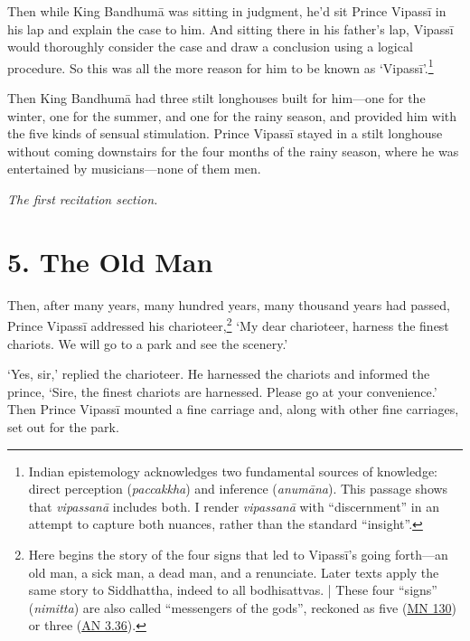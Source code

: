 \documentclass[12pt,openany]{book}%
\newcommand*{\scendsection}[1]{\begin{Center}\begin{small}\textit{#1}\end{small}\end{Center}\addvspace{1em}}
\begin{document}
Then while King \textsanskrit{Bandhumā} was sitting in judgment, he’d sit Prince \textsanskrit{Vipassī} in his lap and explain the case to him. And sitting there in his father’s lap, \textsanskrit{Vipassī} would thoroughly consider the case and draw a conclusion using a logical procedure. So this was all the more reason for him to be known as ‘\textsanskrit{Vipassī}’.\footnote{Indian epistemology acknowledges two fundamental sources of knowledge: direct perception (\textit{paccakkha}) and inference (\textit{\textsanskrit{anumāna}}). This passage shows that \textit{\textsanskrit{vipassanā}} includes both. I render \textit{\textsanskrit{vipassanā}} with “discernment” in an attempt to capture both nuances, rather than the standard “insight”. } 

Then King \textsanskrit{Bandhumā} had three stilt longhouses built for him—one for the winter, one for the summer, and one for the rainy season, and provided him with the five kinds of sensual stimulation. Prince \textsanskrit{Vipassī} stayed in a stilt longhouse without coming downstairs for the four months of the rainy season, where he was entertained by musicians—none of them men. 

\scendsection{The first recitation section. }

\section*{5. The Old Man }

Then, after many years, many hundred years, many thousand years had passed, Prince \textsanskrit{Vipassī} addressed his charioteer,\footnote{Here begins the story of the four signs that led to \textsanskrit{Vipassī}’s going forth—an old man, a sick man, a dead man, and a renunciate. Later texts apply the same story to Siddhattha, indeed to all bodhisattvas. | These four “signs” (\textit{nimitta}) are also called “messengers of the gods”, reckoned as five (\href{https://suttacentral.net/mn130/en/sujato}{MN 130}) or three (\href{https://suttacentral.net/an3.36/en/sujato}{AN 3.36}). } ‘My dear charioteer, harness the finest chariots. We will go to a park and see the scenery.’ 

‘Yes, sir,’ replied the charioteer. He harnessed the chariots and informed the prince, ‘Sire, the finest chariots are harnessed. Please go at your convenience.’ Then Prince \textsanskrit{Vipassī} mounted a fine carriage and, along with other fine carriages, set out for the park. 
\end{document}
